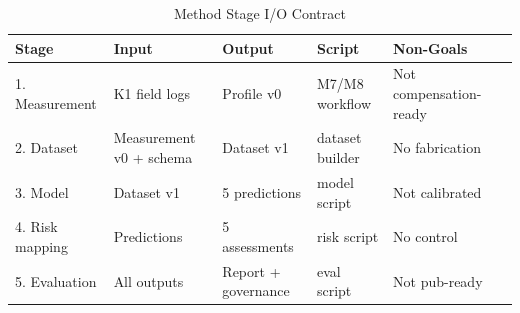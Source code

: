 ﻿\begin{table}[htbp]
\centering
\caption{Method Stage I/O Contract}
\label{tab:method-io}
\begin{tabular}{lp{2.5cm}p{2.5cm}p{2.5cm}p{2.5cm}p{2.5cm}}
\hline
Stage & Input & Output & Script & Non-Goals \\
\hline
1. Measurement & K1 field logs & Profile v0 & M7/M8 workflow & Not compensation-ready \\
2. Dataset & Measurement v0 + schema & Dataset v1 & dataset builder & No fabrication \\
3. Model & Dataset v1 & 5 predictions & model script & Not calibrated \\
4. Risk mapping & Predictions & 5 assessments & risk script & No control \\
5. Evaluation & All outputs & Report + governance & eval script & Not pub-ready \\
\hline
\end{tabular}
\end{table}
